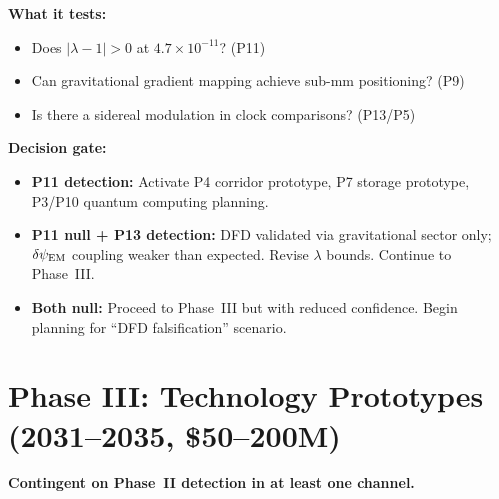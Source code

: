 \documentclass[11pt]{article}
\newcommand{\ee}[1]{\times 10^{#1}}
\newcommand{\dpsiEM}{\delta\psi_{\rm EM}}
\newcommand{\lambdaone}{|\lambda{-}1|}
\begin{document}
\begin{tcolorbox}[colback=blue!5!white, colframe=blue!60!black,
  title=\textbf{Phase II: MEMS Hybrid + P9 Sensor Prototype}]
\textbf{What it tests:}
\begin{itemize}[nosep]
  \item Does $\lambdaone > 0$ at $4.7\ee{-11}$? (P11)
  \item Can gravitational gradient mapping achieve sub-mm positioning?
    (P9)
  \item Is there a sidereal modulation in clock comparisons? (P13/P5)
\end{itemize}

\textbf{Decision gate:}
\begin{itemize}[nosep]
  \item \textbf{P11 detection:} Activate P4 corridor prototype, P7
    storage prototype, P3/P10 quantum computing planning.
  \item \textbf{P11 null + P13 detection:} DFD validated via
    gravitational sector only; $\dpsiEM$ coupling weaker than expected.
    Revise $\lambda$ bounds. Continue to Phase~III.
  \item \textbf{Both null:} Proceed to Phase~III but with reduced
    confidence. Begin planning for ``DFD falsification'' scenario.
\end{itemize}
\end{tcolorbox}

\section{Phase III: Technology Prototypes (2031--2035, \$50--200M)}
\label{sec:phase3}

\textbf{Contingent on Phase~II detection in at least one channel.}
\end{document}
